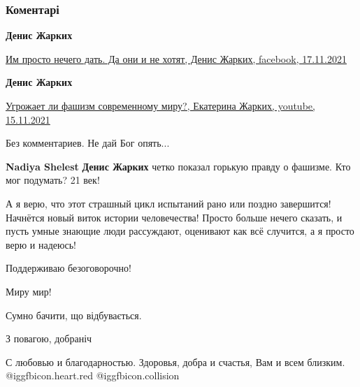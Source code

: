  
 
 
 
 
\subsubsection{Коментарі}

\begin{itemize} %
\textbf{Денис Жарких}

\href{https://www.facebook.com/100006102787780/posts/3124249571121772/}{%
Им просто нечего дать. Да они и не хотят, Денис Жарких, facebook, 17.11.2021%
}

\textbf{Денис Жарких}

\href{https://www.youtube.com/watch?app=desktop&v=dojoAovL-6M}{%
Угрожает ли фашизм современному миру?, Екатерина Жарких, youtube, 15.11.2021%
}

\begin{itemize} %
Без комментариев. Не дай Бог опять...

\textbf{Nadiya Shelest}
\textbf{Денис Жарких} четко показал горькую правду о фашизме. Кто мог подумать? 21 век!
\end{itemize} %

А я верю, что этот страшный цикл испытаний рано или поздно завершится!
Начнётся новый виток истории человечества!
Просто больше нечего сказать, и пусть умные знающие люди рассуждают, оценивают как всё случится, а я просто верю и надеюсь!


Поддерживаю безоговорочно!

Миру мир!

Сумно бачити, що відбувається.

З повагою, добраніч

С любовью и благодарностью.
Здоровья, добра и счастья, Вам и всем близким. @igg{fbicon.heart.red} @igg{fbicon.collision} 

\end{itemize} %
